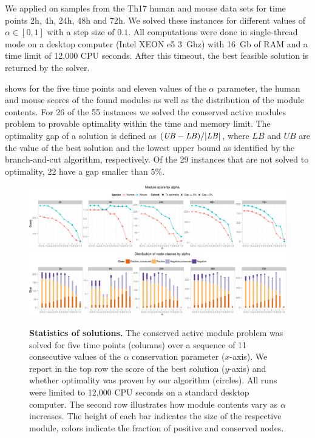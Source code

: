 			We applied \xheinz{} on samples from the Th17 human and mouse data sets for time points \unit{2}{h}, \unit{4}{h}, \unit{24}{h}, \unit{48}{h} and \unit{72}{h}.
			We solved these instances for different values of $\alpha \in [0, 1]$ with a step size of $0.1$.
			All computations were done in single-thread mode on a desktop computer (Intel XEON e5 3~Ghz) with 16~Gb of RAM and a time limit of 12,000 CPU seconds.
			After this timeout, the best feasible solution is returned by the solver.

			 shows for the five time points and eleven values of the $\alpha$ parameter, the human and mouse scores of the found modules as well as the distribution of the module contents.
			For 26 of the 55 instances we solved the conserved active modules problem to provable optimality  within the time and memory limit.
			The optimality gap of a solution is defined as $(\mathit{UB} - \mathit{LB}) / \lvert\mathit{LB}\rvert$, where $\mathit{LB}$ and $\mathit{UB}$ are the value of the best solution and the lowest upper bound as identified by the branch-and-cut algorithm, respectively.
			Of the 29 instances that are not solved to optimality, 22 have a gap smaller than $5\%$.

\begin{figure}[btp]
  \centering
  \includegraphics[width=\linewidth,trim=0 0 0 10mm,clip]{img/score_by_alpha_array-crop.pdf}\\
  \includegraphics[width=\linewidth,trim=0 0 0 10mm,clip]{img/node_classes_by_alpha_array_scores-crop.pdf}
  \caption[Statistics of \xheinz{} solutions]{\textbf{Statistics of \xheinz{} solutions.}
  	  The conserved active module problem was solved for five time points (columns) over a sequence of 11 consecutive values of the $\alpha$ conservation parameter ($x$-axis).
  	  We report in the top row the score of the best solution ($y$-axis) and whether optimality was proven by our algorithm (circles).
  All runs were limited to 12,000 CPU seconds on a standard desktop computer.
  The second row illustrates how module contents vary as $\alpha$ increases.
  The height of each bar indicates the size of the respective module, colors indicate the fraction of positive and conserved nodes.
  \label{fig:scores}}
\end{figure}

